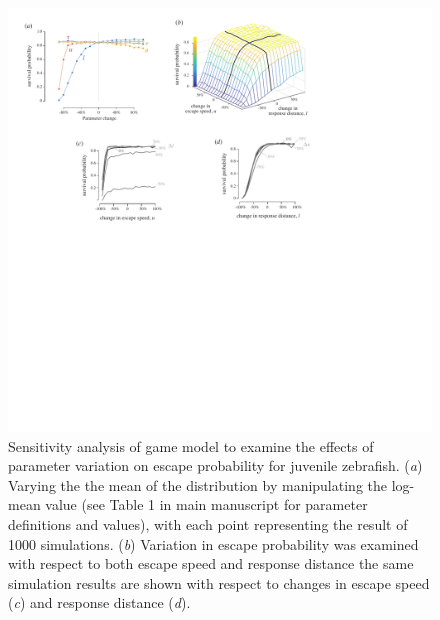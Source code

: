 \documentclass[]{rsos}
\begin{document}
\begin{figure}[!h]
\centering
	\includegraphics[width=5.5in]{supp_fig_sensitivity}
\caption{Sensitivity analysis of game model to examine the effects of parameter variation on escape probability for juvenile zebrafish. 
(\textit{a}) Varying the the mean of the distribution by manipulating the log-mean value (see Table 1 in main manuscript for parameter definitions and values), with each point representing the result of 1000 simulations. 
(\textit{b}) Variation in escape probability was examined with respect to both escape speed and response distance the same simulation results are shown with respect to changes in escape speed (\textit{c}) and response distance (\textit{d}).
}
\label{supp_fig_sense}
\end{figure}
\end{document}
